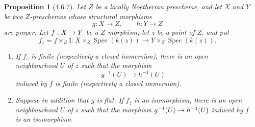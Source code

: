 \documentclass[oneside]{amsart}
\theoremstyle{ega-env-style}
\theoremstyle{ega-thm-env-style}
\newtheorem*{proposition}{Proposition}
\theoremstyle{ega-defn-env-style}
\def\kres{k}                        %
\def\Spec{\operatorname{Spec}}
\renewcommand{\to}{\mathchoice{\longrightarrow}{\rightarrow}{\rightarrow}{\rightarrow}}
\let\EGAOriginalLabel\label
\renewcommand{\label}[1]{\phantomsection\EGAOriginalLabel{#1}}
\begin{document}
\begin{proposition}[4.6.7]
\label{III.4.6.7}
Let $Z$ be a locally Noetherian prescheme, and let $X$ and $Y$ be
two $Z$-preschemes whose structural morphisms
\[
  g:X\longrightarrow Z,\qquad h:Y\longrightarrow Z
\]
are proper.  Let $f:X\to Y$ be a $Z$-morphism, let $z$ be a point
of $Z$, and put
\[
  f_z=f\times_Z1:
  X\times_Z\Spec(\kres(z))
  \longrightarrow
  Y\times_Z\Spec(\kres(z)).
\]
\begin{enumerate}
\item[(i)] If $f_z$ is finite (respectively a closed immersion),
  there is an open neighbourhood $U$ of $z$ such that the morphism
  \[
    g^{-1}(U)\longrightarrow h^{-1}(U)
  \]
  induced by $f$ is finite (respectively a closed immersion).
\item[(ii)] Suppose in addition that $g$ is flat.  If $f_z$ is an
  isomorphism, there is an open neighbourhood $U$ of $z$ such that
  the morphism $g^{-1}(U)\to h^{-1}(U)$ induced by $f$ is an
  isomorphism.
\end{enumerate}
\end{proposition}
\end{document}
